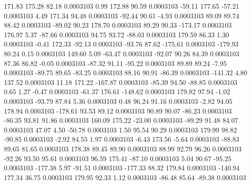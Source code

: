       171.83      175.28       82.18     0.0003103
        0.99      172.88       90.59     0.0003103
      -59.11      177.65      -57.21     0.0003103
        4.49      171.34       94.48     0.0003103
      -92.44       90.61       -4.93     0.0003103
       89.09       89.74       88.42     0.0003103
      -89.02       90.23      178.70     0.0003103
       89.29       90.33     -173.17     0.0003103
      176.97        5.37      -87.66     0.0003103
       94.75       93.72      -88.03     0.0003103
      179.59       86.33        1.30     0.0003103
       -0.41      172.33      -92.13     0.0003103
      -93.76       87.62     -175.61     0.0003103
     -179.93       80.24        0.15     0.0003103
      149.60        5.09      -63.47     0.0003103
      -92.07       90.26       84.39     0.0003103
       87.36       86.82       -0.05     0.0003103
      -87.32       91.11      -95.22     0.0003103
       89.89       89.24       -7.95     0.0003103
      -89.75       89.65      -83.25     0.0003103
       88.16       90.91      -86.39     0.0003103
     -141.32        4.80      137.52     0.0003103
       11.18      171.22     -167.87     0.0003103
      -85.39       94.50      -88.85     0.0003103
        0.65        1.27       -0.47     0.0003103
      -61.37      176.61     -148.62     0.0003103
      179.82       97.94       -1.02     0.0003103
      -93.79       87.84        5.36     0.0003103
        0.48       96.24       91.16     0.0003103
       -2.82       94.05      178.94     0.0003103
     -178.61       93.53       89.12     0.0003103
       90.89       90.07      -86.23     0.0003103
      -86.35       93.81       91.86     0.0003103
      160.09      175.22      -23.00     0.0003103
      -89.29       91.48       84.07     0.0003103
       47.07        4.50      -50.78     0.0003103
        1.50       95.54       90.29     0.0003103
      179.99       98.82      -90.85     0.0003103
       -2.92       84.55        1.97     0.0003103
       -6.43      173.56       -5.64     0.0003103
      -88.83       89.65       81.65     0.0003103
      178.38       89.45       89.90     0.0003103
       88.99       92.79       96.26     0.0003103
      -92.26       93.50       95.61     0.0003103
       96.59      175.41      -87.10     0.0003103
        5.04       90.67      -95.25     0.0003103
     -177.38        5.97      -91.51     0.0003103
     -177.33       88.32      179.84     0.0003103
     -140.94      177.34       36.75     0.0003103
      179.95       92.33        1.12     0.0003103
      -86.48       85.64      -89.38     0.0003103
